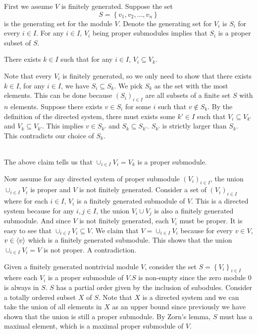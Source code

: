 \documentclass[a4paper, 12pt]{article}
\begin{document}
\begin{solution}
First we assume \(V\) is finitely generated. Suppose the set 
\[S=\left\{ v_1,v_2,\ldots,v_n \right\}\]
is the generating set for the module \(V\). Denote the generating set for \(V_i\) is \(S_i\) for every \(i\in I\). For any \(i\in I\), \(V_i\) being proper submodules implies that \(S_i\) is a proper 
subset of \(S\).

\begin{claim}
There exists \(k\in I\) such that for any \(i\in I\), \(V_i\subseteq V_k\).
\end{claim}
\begin{claimproof}
Note that every \(V_i\) is finitely generated, so we only need to show that there exists \(k\in I\), for any \(i\in I\), we have \(S_i\subseteq S_k\). We pick \(S_k\) as the set with the most elements. This can be done 
because \((S_i)_{i\in I}\) are all subsets of a finite set \(S\) with \(n\) elements. Suppose there exists \(v\in S_i\) for some \(i\) such that \(v\notin S_k\). By the definition of the directed system, there must exists some \(k'\in I\) such 
that \(V_i\subseteq V_{k'}\) and \(V_k\subseteq V_{k'}\). This implies \(v\in S_{k'}\) and \(S_k\subseteq S_{k'}\). \(S_{k'}\) is strictly larger than \(S_k\). This contradicts our choice of \(S_k\). 
\end{claimproof}\\
The above claim tells us that \(\cup_{i\in I}V_i=V_k\) is a proper submodule. 

Now assume for any directed system of proper submodule \((V_i)_{i\in I}\), the union \(\cup_{i\in I}V_i\) is proper and \(V\) is not finitely generated. Consider a set of \((V_i)_{i\in I}\) where for each \(i\in I\), \(V_i\) is a finitely generated submodule of \(V\). This is a directed 
system because for any \(i,j\in I\), the union \(V_i\cup V_j\) is also a finitely generated submodule. And since \(V\) is not finitely generated, each \(V_i\) must be proper. It is easy to see that \(\cup_{i\in I}V_i\subseteq V\). We claim that \(V=\cup_{i\in I}V_i\) because for every \(v\in V\), \(v\in \langle v\rangle\) which is a 
finitely generated submodule. This shows that the union \(\cup_{i\in I}V_i=V\) is not proper. A contradiction.

Given a finitely generated nontrivial module \(V\), consider the set \(S=\left\{ V_i \right\}_{i\in I}\) where each \(V_i\) is a proper submodule of \(V\).\(S\) is non-empty since the zero module \(0\) is always in \(S\). \(S\) has a partial order given by the inclusion of subodules. Consider a totally ordered subset \(X\) of \(S\). Note that 
\(X\) is a directed system and we can take the union of all elements in \(X\) as an upper bound since previously we have shown that the union is still a proper submodule. By Zorn's lemma, \(S\) must has a maximal element, which is a maximal proper submodule of \(V\).
\end{solution}
\end{document}
